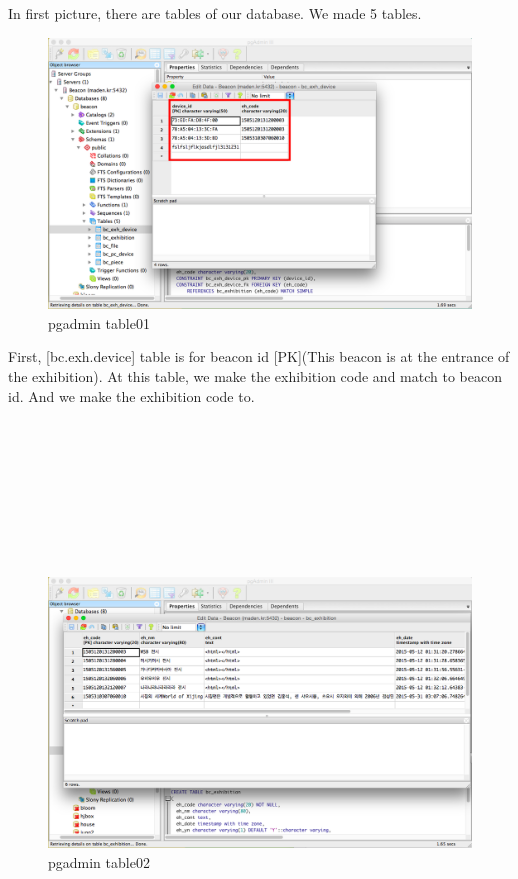 \documentclass[conference]{IEEEtran}
\begin{document}
In first picture, there are tables of our database. We made 5 tables.\\

\begin{figure}[htbp]
\begin{center}
    \includegraphics[scale=0.2]{img_pgadmin02}
    \caption{pgadmin table01} 
\end{center}
\end{figure}

First, [bc.exh.device] table is for beacon id [PK](This beacon is at the entrance of the exhibition). At this table, we make the exhibition code and match to beacon id. And we make the exhibition code to.\\\\\\\\\\\\\\\\\\


\begin{figure}[htbp]
\begin{center}
    \includegraphics[scale=0.2]{img_pgadmin002}
    \caption{pgadmin table02} 
\end{center}
\end{figure}
\end{document}
